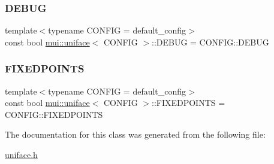 \subsubsection{\texorpdfstring{D\+E\+B\+UG}{DEBUG}}
{\footnotesize\ttfamily template$<$typename C\+O\+N\+F\+IG  = default\+\_\+config$>$ \\
const bool \hyperlink{classmui_1_1uniface}{mui\+::uniface}$<$ C\+O\+N\+F\+IG $>$\+::D\+E\+B\+UG = C\+O\+N\+F\+I\+G\+::\+D\+E\+B\+UG\hspace{0.3cm}{\ttfamily [static]}}

\mbox{\label{classmui_1_1uniface_a19b11cf2c84dbb5c8c08849263068913}} 
\subsubsection{\texorpdfstring{F\+I\+X\+E\+D\+P\+O\+I\+N\+TS}{FIXEDPOINTS}}
{\footnotesize\ttfamily template$<$typename C\+O\+N\+F\+IG  = default\+\_\+config$>$ \\
const bool \hyperlink{classmui_1_1uniface}{mui\+::uniface}$<$ C\+O\+N\+F\+IG $>$\+::F\+I\+X\+E\+D\+P\+O\+I\+N\+TS = C\+O\+N\+F\+I\+G\+::\+F\+I\+X\+E\+D\+P\+O\+I\+N\+TS\hspace{0.3cm}{\ttfamily [static]}}



The documentation for this class was generated from the following file\+:\begin{DoxyCompactItemize}
\item 
\hyperlink{uniface_8h}{uniface.\+h}\end{DoxyCompactItemize}
